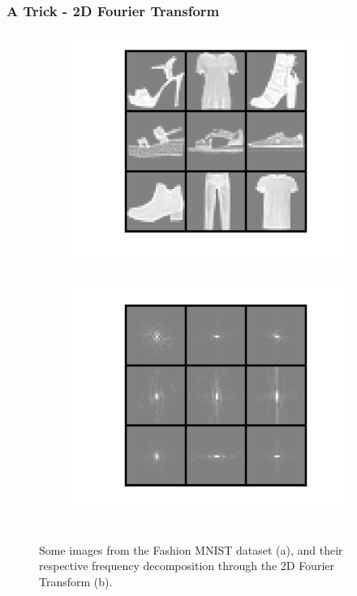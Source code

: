 \documentclass{beamer}
\begin{document}
\begin{frame}
\frametitle{A Trick - 2D Fourier Transform}
	\begin{figure}[hbt]
\begin{subfigure}{.5\textwidth}
  \centering
  \includegraphics[width=\linewidth]{fashion_raw}
  \caption{~}
\end{subfigure}%
\begin{subfigure}{.5\textwidth}
  \centering
  \includegraphics[width=\linewidth]{fashion_ft2}
  \caption{~}
\end{subfigure}
\vspace{1em}
\caption{Some images from the Fashion MNIST dataset (a), and their respective frequency decomposition through the 2D Fourier Transform (b).}
	\end{figure}
\end{frame}
\end{document}
